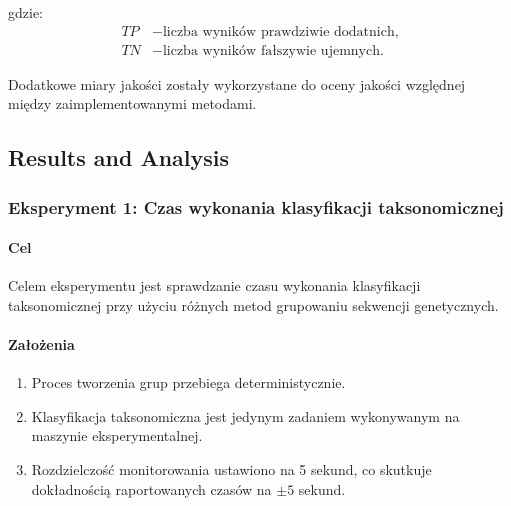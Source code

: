 \documentclass{article}
\newcommand{\temporary}[1]{
    \begin{tcolorbox}[colframe=red, colback=white, title={\textbf{WERSJA PO POLSKU}}, sharp corners=south]
        #1
    \end{tcolorbox}
}
\begin{document}
{                gdzie:
                \begin{align*}
                    TP &- \text{liczba wyników prawdziwie dodatnich,} \\
                    TN &- \text{liczba wyników fałszywie ujemnych.}
                \end{align*}
        
                Dodatkowe miary jakości zostały wykorzystane do oceny jakości względnej między zaimplementowanymi metodami.
            }

        \subsection{Results and Analysis}

            \temporary{
                \subsubsection{Eksperyment 1: Czas wykonania klasyfikacji taksonomicznej}

            \paragraph{Cel}
                Celem eksperymentu jest sprawdzanie czasu wykonania klasyfikacji taksonomicznej przy użyciu różnych metod grupowaniu sekwencji genetycznych.

            \paragraph{Założenia}
                \begin{enumerate}
                    \item {
                        Proces tworzenia grup przebiega deterministycznie.
                    }
                    \item {
                        Klasyfikacja taksonomiczna jest jedynym zadaniem wykonywanym na maszynie eksperymentalnej.
                    }
                    \item {
                        Rozdzielczość monitorowania ustawiono na 5 sekund, co skutkuje dokładnością raportowanych czasów na $\pm 5$ sekund.
                    }
                \end{enumerate}

}
\end{document}
